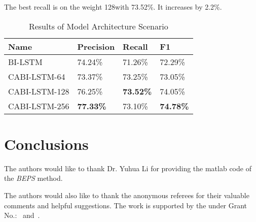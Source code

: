 The best recall is on the weight 128with 73.52\%. It increases by 2.2\%.

\begin{table}
	\caption{Results of Model Architecture Scenario}
	\label{tab:architecure_scenario}
	\begin{tabular}{llll}
		\toprule
		Name			&Precision					&Recall		&F1			\\
		\midrule
		BI-LSTM				&	74.24\%				&	71.26\%				&	72.29\%	\\
		CABI-LSTM-64		&	73.37\%				&	73.25\%				&	73.05\%	\\
		CABI-LSTM-128		&	76.25\%				&	\textbf{73.52\%}	&	74.05\%	\\
		CABI-LSTM-256		&	\textbf{77.33\%}	&	73.10\%				&	\textbf{74.78\%}\\
		\bottomrule
	\end{tabular}
\end{table}


\section{Conclusions}



\begin{acks}
  The authors would like to thank Dr. Yuhua Li for providing the
  matlab code of  the \textit{BEPS} method. 

  The authors would also like to thank the anonymous referees for
  their valuable comments and helpful suggestions. The work is
  supported by the  under Grant
  No.:~
  and~.

\end{acks}
